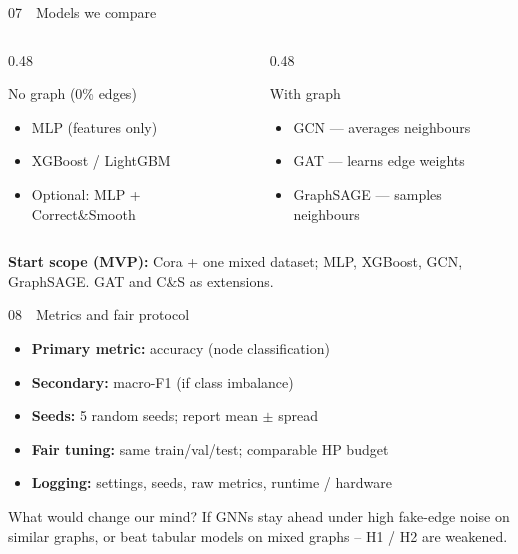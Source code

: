 \documentclass[
  english,
  aspectratio=169,
]{beamer}
\begin{document}
\begin{frame}{07~~Models we compare}
  \begin{columns}[T]
    \begin{column}{0.48\textwidth}
      \begin{block}{No graph (0\% edges)}
        \begin{itemize}
          \item MLP (features only)
          \item XGBoost / LightGBM
          \item Optional: MLP + Correct\&Smooth
        \end{itemize}
      \end{block}
    \end{column}
    \begin{column}{0.48\textwidth}
      \begin{block}{With graph}
        \begin{itemize}
          \item GCN --- averages neighbours
          \item GAT --- learns edge weights
          \item GraphSAGE --- samples neighbours
        \end{itemize}
      \end{block}
    \end{column}
  \end{columns}

  \vspace{0.8em}
  \textbf{Start scope (MVP):}
  Cora + one mixed dataset;
  MLP, XGBoost, GCN, GraphSAGE.
  GAT and C\&S as extensions.
\end{frame}

\begin{frame}{08~~Metrics and fair protocol}
  \begin{itemize}
    \item \textbf{Primary metric:} accuracy (node classification)
    \item \textbf{Secondary:} macro-F1 (if class imbalance)
    \item \textbf{Seeds:} 5 random seeds; report mean $\pm$ spread
    \item \textbf{Fair tuning:} same train/val/test; comparable HP budget
    \item \textbf{Logging:} settings, seeds, raw metrics, runtime / hardware
  \end{itemize}

  \vspace{0.6em}
  \begin{alertblock}{What would change our mind?}
    If GNNs stay ahead under high fake-edge noise on similar graphs,
    or beat tabular models on mixed graphs -- H1 / H2 are weakened.
  \end{alertblock}
\end{frame}
\end{document}
